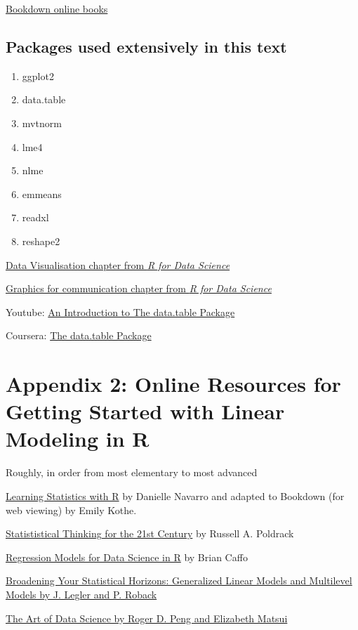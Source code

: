 \documentclass[]{book}
\providecommand{\tightlist}{%
  \setlength{\itemsep}{0pt}\setlength{\parskip}{0pt}}
\begin{document}
\href{https://bookdown.org}{Bookdown online books}

\section{Packages used extensively in this
text}\label{packages-used-extensively-in-this-text}

\begin{enumerate}
\def\labelenumi{\arabic{enumi}.}
\tightlist
\item
  ggplot2
\item
  data.table
\item
  mvtnorm
\item
  lme4
\item
  nlme
\item
  emmeans
\item
  readxl
\item
  reshape2
\end{enumerate}

\href{http://r4ds.had.co.nz/data-visualisation.html}{Data Visualisation
chapter from \emph{R for Data Science}}

\href{http://r4ds.had.co.nz/graphics-for-communication.html}{Graphics
for communication chapter from \emph{R for Data Science}}

Youtube: \href{https://www.youtube.com/watch?v=pc1ARG6kbAM}{An
Introduction to The data.table Package}

Coursera:
\href{https://www.coursera.org/learn/data-cleaning/lecture/trMZ7/the-data-table-package}{The
data.table Package}

\chapter*{Appendix 2: Online Resources for Getting Started with Linear
Modeling in
R}\label{appendix-2-online-resources-for-getting-started-with-linear-modeling-in-r}

Roughly, in order from most elementary to most advanced

\href{https://https://learningstatisticswithr-bookdown.netlify.com}{Learning
Statistics with R} by Danielle Navarro and adapted to Bookdown (for web
viewing) by Emily Kothe.

\href{http://statsthinking21.org}{Statististical Thinking for the 21st
Century} by Russell A. Poldrack

\href{https://leanpub.com/regmods}{Regression Models for Data Science in
R} by Brian Caffo

\href{https://bookdown.org/roback/bookdown-bysh/}{Broadening Your
Statistical Horizons: Generalized Linear Models and Multilevel Models by
J. Legler and P. Roback}

\href{https://bookdown.org/rdpeng/artofdatascience/}{The Art of Data
Science by Roger D. Peng and Elizabeth Matsui}


\end{document}
